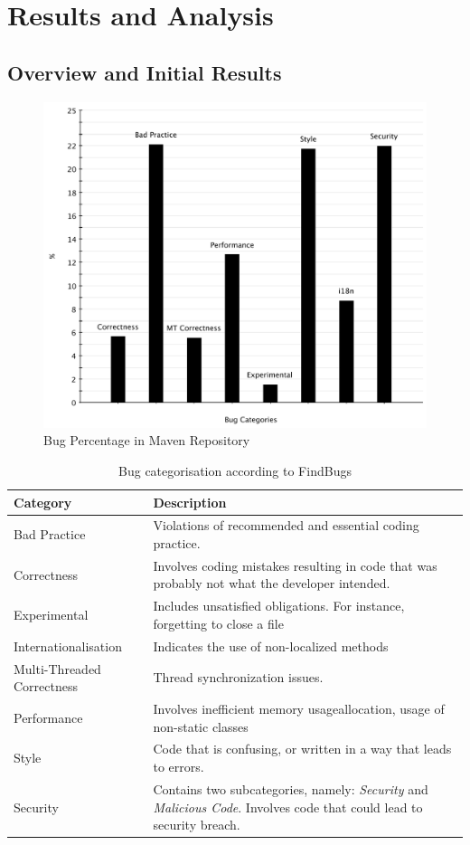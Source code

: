 \documentclass[conference]{IEEEtran}
\begin{document}
\section{Results and Analysis}
\label{sec:res}

\subsection{Overview and Initial Results}
\label{sec:overview}

\begin{figure}
	\centering
	\includegraphics[scale=0.6]{bug_percent}
	\caption{Bug Percentage in Maven Repository}
	\label{fig:bug-percentage}
\end{figure}

\begin{table}
\centering
\caption{Bug categorisation according to FindBugs}
\label{tbl:bug-categorisation}
\begin{tabular}{l p{15em}}
\hline
Category & Description\\
\hline
Bad Practice & Violations of recommended and essential
coding practice. \\
Correctness & Involves coding mistakes resulting in code
that was probably not what the developer intended. \\
Experimental & Includes unsatisfied obligations. For instance,
forgetting to close a file \\
Internationalisation & Indicates the use of non-localized methods \\
Multi-Threaded Correctness & Thread synchronization issues. \\
Performance & Involves inefficient memory usageallocation, usage 
of non-static classes \\
Style & Code that is confusing, or
written in a way that leads to errors.\\
Security & Contains two subcategories, namely: {\it Security} and {\it
Malicious Code}. Involves code that could lead to security breach. \\
\hline
\end{tabular}
\end{table}
\end{document}
